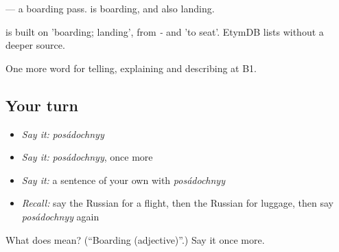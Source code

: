 \emph{ } — a boarding pass. \emph{} is boarding, and also landing.

\begin{cousinweb}
\emph{} is built on \emph{} 'boarding; landing', from \emph{-} and \emph{} 'to seat'. EtymDB lists \emph{} without a deeper source.
\end{cousinweb}

\begin{grammarlens}[title={What you've built}]
One more word for telling, explaining and describing at B1.
\end{grammarlens}

\subsection*{Your turn}
\begin{itemize}
\raggedright
  \item \emph{Say it:} \emph{posádochnyy}
  \item \emph{Say it:} \emph{posádochnyy}, once more
  \item \emph{Say it:} a sentence of your own with \emph{posádochnyy}
  \item \emph{Recall:} say the Russian for a flight, then the Russian for luggage, then say \emph{posádochnyy} again
\end{itemize}

\begin{tcolorbox}[breakable,colback=teal!4,colframe=teal!35!black,title={Before you move on}]
What does  mean? (\textquotedblleft{}Boarding (adjective)\textquotedblright{}.) Say it once more.
\end{tcolorbox}
